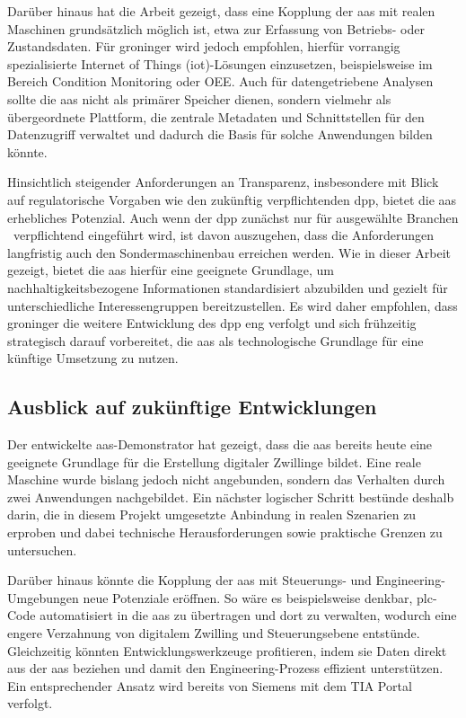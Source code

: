 Darüber hinaus hat die Arbeit gezeigt, dass eine Kopplung der \acs{aas} mit realen Maschinen grundsätzlich möglich ist, etwa zur Erfassung von Betriebs- oder Zustandsdaten. 
Für groninger wird jedoch empfohlen, hierfür vorrangig spezialisierte Internet of Things (\acs{iot})-Lösungen einzusetzen, beispielsweise im Bereich Condition Monitoring oder OEE.
Auch für datengetriebene Analysen sollte die \acs{aas} nicht als primärer Speicher dienen, sondern vielmehr als übergeordnete Plattform, die zentrale Metadaten und Schnittstellen für den Datenzugriff verwaltet und dadurch die Basis für solche Anwendungen bilden könnte.

Hinsichtlich steigender Anforderungen an Transparenz, insbesondere mit Blick auf regulatorische Vorgaben wie den zukünftig verpflichtenden \acs{dpp}, bietet die \acs{aas} erhebliches Potenzial. 
Auch wenn der \acs{dpp} zunächst nur für ausgewählte Branchen%
\pagebreak
~verpflichtend eingeführt wird, ist davon auszugehen, dass die Anforderungen langfristig auch den Sondermaschinenbau erreichen werden. 
Wie in dieser Arbeit gezeigt, bietet die \acs{aas} hierfür eine geeignete Grundlage, um nachhaltigkeitsbezogene Informationen standardisiert abzubilden und gezielt für unterschiedliche Interessengruppen bereitzustellen. 
Es wird daher empfohlen, dass groninger die weitere Entwicklung des \acs{dpp} eng verfolgt und sich frühzeitig strategisch darauf vorbereitet, die \acs{aas} als technologische Grundlage für eine künftige Umsetzung zu nutzen.

\subsection{Ausblick auf zukünftige Entwicklungen}
Der entwickelte \acs{aas}-Demonstrator hat gezeigt, dass die \acs{aas} bereits heute eine geeignete Grundlage für die Erstellung digitaler Zwillinge bildet. 
Eine reale Maschine wurde bislang jedoch nicht angebunden, sondern das Verhalten durch zwei Anwendungen nachgebildet. 
Ein nächster logischer Schritt bestünde deshalb darin, die in diesem Projekt umgesetzte Anbindung in realen Szenarien zu erproben und dabei technische Herausforderungen sowie praktische Grenzen zu untersuchen. 

Darüber hinaus könnte die Kopplung der \acs{aas} mit Steuerungs- und Engineering-Umge\-bungen neue Potenziale eröffnen. 
So wäre es beispielsweise denkbar, \ac{plc}-Code automatisiert in die \acs{aas} zu übertragen und dort zu verwalten, wodurch eine engere Verzahnung von digitalem Zwilling und Steuerungsebene entstünde. 
Gleichzeitig könnten Entwicklungswerkzeuge profitieren, indem sie Daten direkt aus der \acs{aas} beziehen und damit den Engineering-Prozess effizient unterstützen. 
Ein entsprechender Ansatz wird bereits von Siemens mit dem TIA Portal verfolgt.

